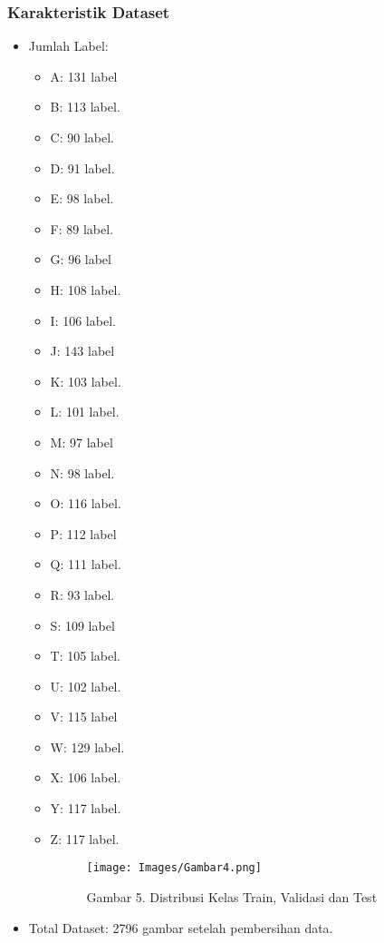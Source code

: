 \documentclass[12pt,a4paper]{article}
\begin{document}
\subsubsection{Karakteristik Dataset}
\begin{itemize}
    \item Jumlah Label:
    \begin{itemize}
        \item A: 131 label
        \item B: 113 label.
        \item C: 90 label.
        \item D: 91 label.
        \item E: 98 label.
        \item F: 89 label.
        \item G: 96 label
        \item H: 108 label.
        \item I: 106 label.
        \item J: 143 label
        \item K: 103 label.
        \item L: 101 label.
        \item M: 97 label
        \item N: 98 label.
        \item O: 116 label.
        \item P: 112 label
        \item Q: 111 label.
        \item R: 93 label.
        \item S: 109 label
        \item T: 105 label.
        \item U: 102 label.
        \item V: 115 label
        \item W: 129 label.
        \item X: 106 label.
        \item Y: 117 label.
        \item Z: 117 label.
        \begin{figure}[h]
            \centering
            \texttt{[image: Images/Gambar4.png]}
            \caption*{Gambar 5. Distribusi Kelas Train, Validasi dan Test}
            \label{fig:enter-label}
        \end{figure}
    \end{itemize}
    \item Total Dataset: 2796 gambar setelah pembersihan data.

\end{itemize}
\end{document}
